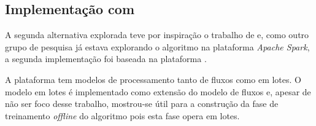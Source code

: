 \subsection{Implementação com \flink}


A segunda alternativa explorada teve por inspiração o trabalho de
 e, como outro grupo de pesquisa já estava explorando
o algoritmo na plataforma \emph{Apache Spark}, a segunda implementação
foi baseada na plataforma \flink.

A plataforma \flink tem modelos de processamento tanto de fluxos como em lotes.
O modelo em lotes é implementado como extensão do modelo de fluxos e, apesar de
não ser foco desse trabalho, mostrou-se útil para a construção da fase de
treinamento \emph{offline} do algoritmo \minas pois esta fase opera em lotes.



